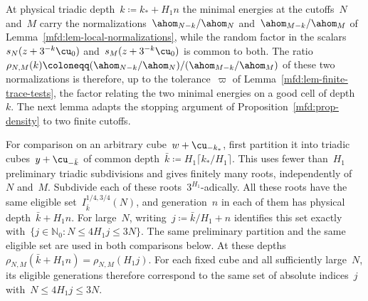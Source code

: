 \documentclass[11pt]{amsart}
\begin{document}
At physical triadic depth~$k\coloneqq k_*+H_1n$ the minimal energies at the cutoffs~$N$ and~$M$ carry the normalizations~$\ahom_{N-k}/\ahom_N$ and~$\ahom_{M-k}/\ahom_M$ of Lemma~\ref{mfd:lem-local-normalizations}, while the random factor in the scalars~$s_N(z+3^{-k}\cu_0)$ and~$s_M(z+3^{-k}\cu_0)$ is common to both. The ratio~$\rho_{N,M}(k)\coloneqq(\ahom_{N-k}/\ahom_N)/(\ahom_{M-k}/\ahom_M)$ of these two normalizations is therefore, up to the tolerance~$\varpi$ of Lemma~\ref{mfd:lem-finite-trace-tests}, the factor relating the two minimal energies on a good cell of depth~$k$. The next lemma adapts the stopping argument of Proposition~\ref{mfd:prop-density} to two finite cutoffs.

\smallskip

For comparison on an arbitrary cube~$w+\cu_{-k_*}$, first partition it into triadic cubes~$y+\cu_{-\bar k}$ of common depth~$\bar k\coloneqq H_1\lceil k_*/H_1\rceil$. This uses fewer than~$H_1$ preliminary triadic subdivisions and gives finitely many roots, independently of~$N$ and~$M$. Subdivide each of these roots~$3^{H_1}$-adically. All these roots have the same eligible set~$I_{\bar k}^{1/4,3/4}(N)$, and generation~$n$ in each of them has physical depth~$\bar k+H_1n$. For large~$N$, writing~$j\coloneqq\bar k/H_1+n$ identifies this set exactly with~$\{j\in\mathbb N_0:N\leq4H_1j\leq3N\}$. The same preliminary partition and the same eligible set are used in both comparisons below. At these depths~$\rho_{N,M}(\bar k+H_1n)=\rho_{N,M}(H_1j)$. For each fixed cube and all sufficiently large~$N$, its eligible generations therefore correspond to the same set of absolute indices~$j$ with~$N\leq4H_1j\leq3N$.
\end{document}
